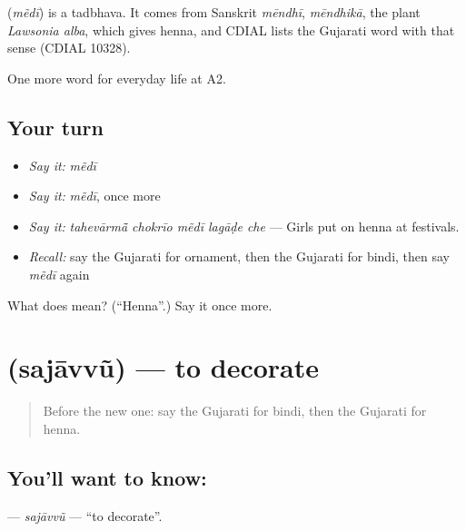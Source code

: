 \begin{cousinweb}
\textbf{} (\emph{mẽdī}) is a tadbhava. It comes from Sanskrit \emph{mēndhī}, \emph{mēndhikā}, the plant \emph{Lawsonia alba}, which gives henna, and CDIAL lists the Gujarati word with that sense (CDIAL 10328).
\end{cousinweb}

\begin{grammarlens}[title={What you've built}]
One more word for everyday life at A2.
\end{grammarlens}

\subsection*{Your turn}
\begin{itemize}
\raggedright
  \item \emph{Say it:} \emph{mẽdī}
  \item \emph{Say it:} \emph{mẽdī}, once more
  \item \emph{Say it:} \emph{tahevārmā̃ chokrīo mẽdī lagāḍe che} — Girls put on henna at festivals.
  \item \emph{Recall:} say the Gujarati for ornament, then the Gujarati for bindi, then say \emph{mẽdī} again
\end{itemize}

\begin{tcolorbox}[breakable,colback=teal!4,colframe=teal!35!black,title={Before you move on}]
What does  mean? (\textquotedblleft{}Henna\textquotedblright{}.) Say it once more.
\end{tcolorbox}
\section[\texorpdfstring{\gu{સજાવવું} (sajāvvũ)}{સજાવવું (sajāvvũ)}]{ (sajāvvũ) — to decorate}

\label{lesson:GU-C156-sajavvu}



\begin{quote}
Before the new one: say the Gujarati for bindi, then the Gujarati for henna.
\end{quote}

\subsection*{You'll want to know: }
\textbf{} — \emph{sajāvvũ} — \textquotedblleft{}to decorate\textquotedblright{}.


